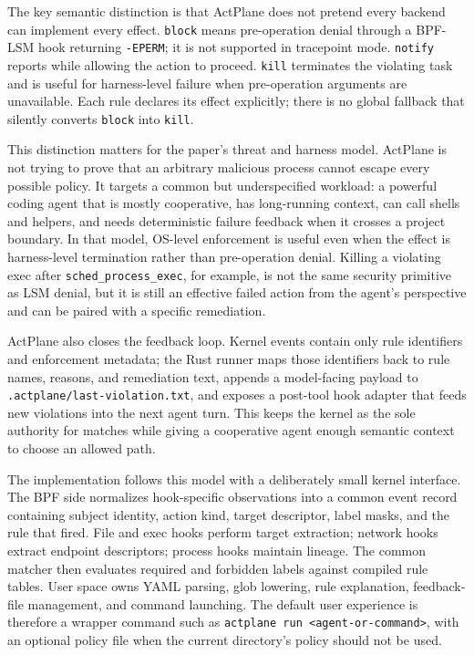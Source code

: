 \documentclass[sigplan,10pt]{acmart}
\begin{document}
The key semantic distinction is that ActPlane does not pretend every backend
can implement every effect. \texttt{block} means pre-operation denial through a
BPF-LSM hook returning \texttt{-EPERM}; it is not supported in tracepoint mode.
\texttt{notify} reports while allowing the action to proceed. \texttt{kill}
terminates the violating task and is useful for harness-level failure when
pre-operation arguments are unavailable. Each rule declares its effect
explicitly; there is no global fallback that silently converts \texttt{block}
into \texttt{kill}.

This distinction matters for the paper's threat and harness model. ActPlane is
not trying to prove that an arbitrary malicious process cannot escape every
possible policy. It targets a common but underspecified workload: a powerful
coding agent that is mostly cooperative, has long-running context, can call
shells and helpers, and needs deterministic failure feedback when it crosses a
project boundary. In that model, OS-level enforcement is useful even when the
effect is harness-level termination rather than pre-operation denial. Killing a
violating exec after \texttt{sched\_process\_exec}, for example, is not the same
security primitive as LSM denial, but it is still an effective failed action
from the agent's perspective and can be paired with a specific remediation.

ActPlane also closes the feedback loop. Kernel events contain only rule
identifiers and enforcement metadata; the Rust runner maps those identifiers
back to rule names, reasons, and remediation text, appends a model-facing
payload to \texttt{.actplane/last-violation.txt}, and exposes a post-tool hook
adapter that feeds new violations into the next agent turn. This keeps the
kernel as the sole authority for matches while giving a cooperative agent enough
semantic context to choose an allowed path.

The implementation follows this model with a deliberately small kernel
interface. The BPF side normalizes hook-specific observations into a common
event record containing subject identity, action kind, target descriptor, label
masks, and the rule that fired. File and exec hooks perform target extraction;
network hooks extract endpoint descriptors; process hooks maintain lineage. The
common matcher then evaluates required and forbidden labels against compiled
rule tables. User space owns YAML parsing, glob lowering, rule explanation,
feedback-file management, and command launching. The default user experience is
therefore a wrapper command such as \texttt{actplane run <agent-or-command>},
with an optional policy file when the current directory's policy should not be
used.
\end{document}
